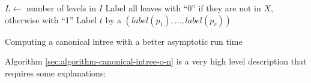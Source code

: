 \begin{algorithm}
  \begin{algorithmic}[5]
      \State $L \gets $ number of levels in $I$
      \State Label all leaves with ``0'' if they are not in $X$, otherwise with ``1''
        \label{alg:canonical-intree-inner-loop}
          \State Label $t$ by a $(label(p_1),\dots,label(p_r))$ 
          \label{alg:canonical-intree-concatenate-line}
        \EndFor
        \label{alg:canonical-intree-sorting-line}
        \label{alg:canonical-intree-numbering-line}
      \EndFor
    \EndProcedure
  \end{algorithmic}
  \caption{Computing a canonical intree with a better asymptotic run time}
  \label{sec:algorithm-canonical-intree-o-n}
\end{algorithm}

Algorithm \ref{sec:algorithm-canonical-intree-o-n} is a very high level description that requires some explanations:


